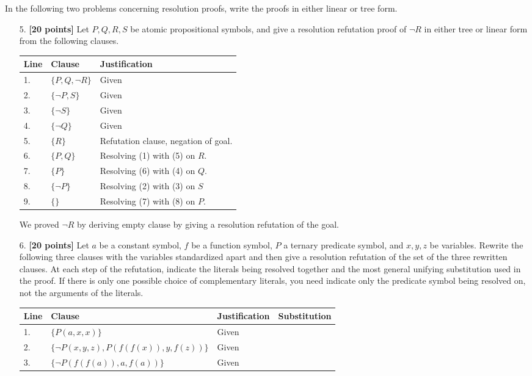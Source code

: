 \documentclass{article}
\begin{document}
In the following two problems concerning resolution proofs, write the
proofs in either linear or tree form.

\begin{enumerate}
    
\item[5.] \textbf{[20 points]} Let $P,Q,R,S$ be atomic propositional
  symbols, and give a resolution refutation proof of $\neg R$ in
  either tree or linear form from the following clauses.
  \begin{answer}
          
  
  \begin{center}
    \begin{tabular}{lll}
      Line & Clause & Justification \\ \hline
      1. & $\{ P, Q, \neg R \}$ & Given \\
      2. & $\{ \neg P, S \}$ & Given \\
      3. & $\{ \neg S \}$ & Given \\
      4. & $\{ \neg Q \}$ & Given \\ \hline
      5. & $\{ R \}$ & Refutation clause, negation of goal. \\
      6. & $\{ P, Q \}$ & Resolving (1) with (5) on $R$. \\
      7. & $\{ P \}$ & Resolving (6) with (4) on $Q$.\\
      8. & $\{ \neg P \}$ & Resolving (2) with (3) on $S$ \\
      9. & $\{ \}$ & Resolving (7) with (8) on $P$. 
    \end{tabular}
  \end{center}
  We proved $\neg R$ by deriving empty clause by giving a resolution refutation of the goal.
\end{answer}
  
\item[6.] \textbf{[20 points]} Let $a$ be a constant symbol, $f$ be a
  function symbol, $P$ a ternary predicate symbol, and $x,y,z$ be
  variables.  Rewrite the following three clauses with the variables
  standardized apart and then give a resolution refutation of the set
  of the three rewritten clauses.  At each step of the refutation,
  indicate the literals being resolved together and the most general
  unifying substitution used in the proof.  If there is only one
  possible choice of complementary literals, you need indicate only
  the predicate symbol being resolved on, not the arguments of the
  literals.
  
  \begin{center}
    \begin{tabular}{llll}
      Line & Clause & Justification & Substitution \\ \hline
      1. & $\{ P(a,x,x) \}$ & Given & \\
      2. & $\{ \neg P(x,y,z), P(f(f(x)),y,f(z)) \}$ & Given & \\
      3. & $\{ \neg P(f(f(a)),a,f(a)) \}$ & Given & \\ \hline
    \end{tabular}
  \end{center}
  

\end{enumerate}
\end{document}
